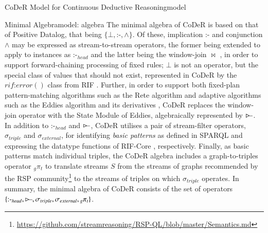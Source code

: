 \begin{nestedsection}{CoDeR Model for Continuous Deductive Reasoning}{model}
	\begin{nestedsection}{Minimal Algebra}{model: algebra}
		The minimal algebra of CoDeR is based on that of Positive Datalog, that being ${\{\bot, \text{:-}, \wedge\}}$.
		Of these, implication $\text{:-}$ and conjunction $\wedge$ may be expressed as stream-to-stream operators, the former being extended to apply to instances as $\text{:-}_{head}$ and the latter being the window-join $\Join$ \citep{niagaraCQ}, in order to support forward-chaining processing of fixed rules;
		$\bot$ is not an operator, but the special class of values that should not exist, represented in CoDeR by the ${rif\text{:}error()}$ class from RIF \citep{w3crif}.
		Further, in order to support both fixed-plan pattern-matching algorithms such as the Rete algorithm \citep{forgy79} and adaptive algorithms such as the Eddies algorithm \citep{eddies} and its derivatives \citep{CACQ,TCQ}, CoDeR replaces the window-join operator with the State Module of Eddies, algebraically represented by $\rstreamjoin$.
		In addition to $\text{:-}_{head}$ and $\rstreamjoin$, CoDeR utilises a pair of stream-filter operators, $\sigma_{triple}$ and $\sigma_{external}$, for identifying \emph{basic patterns} as defined in SPARQL \citep{w3csparql} and expressing the datatype functions of RIF-Core \citep{w3crifcore}, respectively.
		Finally, as basic patterns match individual triples, the CoDeR algebra includes a graph-to-triples operator ${{}_g\pi_t}$ to translate streams $S$ from the streams of graphs recommended by the RSP community\footnote{\url{https://github.com/streamreasoning/RSP-QL/blob/master/Semantics.md}} to the streams of triples on which $\sigma_{triple}$ operates.
		In summary, the minimal algebra of CoDeR consists of the set of operators ${\{\text{:-}_{head}, \rstreamjoin, \sigma_{triple}, \sigma_{external}, {}_g{\pi_t}\}}$.


\end{nestedsection}
\end{nestedsection}
